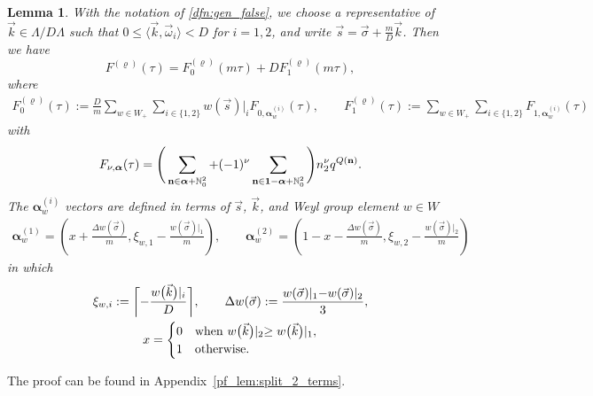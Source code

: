 \documentclass[pdftex]{sigma}
\def\bos{\varrho}
\def\bal{\boldsymbol{\alpha}}
\newtheorem{lem}[thm]{Lemma}
\theoremstyle{definition}
\numberwithin{equation}{section}
\begin{document}
\begin{lem}\label{lem:split_2_terms}
	With the notation of \eqref{dfn:gen_false}, we choose a representative of $\vec k\in \Lambda/D\Lambda$ such that $0\leq \langle \vec k, \vec\omega_i\rangle <D$ for $i=1,2$, and write $\vec{s}=\vec{\sigma}+\frac{m}{D}\vec{k}$.
 Then we have
	\begin{equation}\label{Section2-Fsplit}
		F^{(\bos)}(\tau) =
		F_{0}^{(\bos)}(m\tau)+D F_{1}^{\left(\bos\right)}(m\tau),
	\end{equation}
	where
	\begin{gather}\label{def:Fiq2_1}
			F_{0}^{\left( \bos \right)}( \tau)
			:= \frac{D}{m}\sum_{w\in W_+}\sum_{i \in \{1,2\}} w(\vec s)\lvert_i
			F_{0,\bal^{(i)}_w}(\tau),\qquad
			F_{1}^{\left( \bos \right)}( \tau) :=\sum_{w\in W_+}\sum_{i \in \{1,2\}}
			F_{1,\bal^{(i)}_w}(\tau)
	\end{gather}
	with
	\begin{equation}\label{def:Fiq2_1-comp}
		F_{\nu,\bal}(\tau) = \Bigg( \sum_{\mathbf{n}\in \bal+\mathbb{N}_{0}^{2}}+(-1)^\nu\sum_{\mathbf{n}\in {\bf 1}- \bal+\mathbb{N}_{0}^{2}} \Bigg) n_2^\nu q^{Q( \mathbf{n})}.
	\end{equation}
	The $\bal^{(i)}_{w}$ vectors are defined in terms of $\vec{s}$, $\vec{k}$, and Weyl group element $w\in W$
	\begin{gather}
		\bal_w^{(1)}=
		\left(x+ \frac{\Delta w(\vec{\sigma}) }{m},
		\xi_{w,1} - \frac{w(\vec{\sigma})\lvert_1}{m}\right), \qquad
		\bal_w^{(2)}=
		\left(1- x-\frac{\Delta w(\vec{\sigma}) }{m},
		\xi_{w,2} - \frac{w(\vec{\sigma})\lvert_2}{m}\right)
		\label{eq:alphawidef0A}
	\end{gather}
	in which
	\begin{gather*}
{ \xi_{w,i}:= \biggl\lceil - \frac{w\bigl(\vec{k}\bigr)\vert_i}{D} \biggr\rceil }, \qquad \Delta w(\vec{\sigma}) : = \frac{w(\vec{\sigma})\lvert_1-w(\vec{\sigma})\lvert_2 }{3}, \\
		x= \begin{cases} 0 & {\rm when}\ w\bigl(\vec{k}\bigr)\lvert_2\geq w\bigl(\vec{k}\bigr)\lvert_1, \\ 1 & {\rm otherwise}.
		\end{cases}
	\end{gather*}
\end{lem}
The proof can be found in Appendix~\ref{pf_lem:split_2_terms}.
\end{document}
